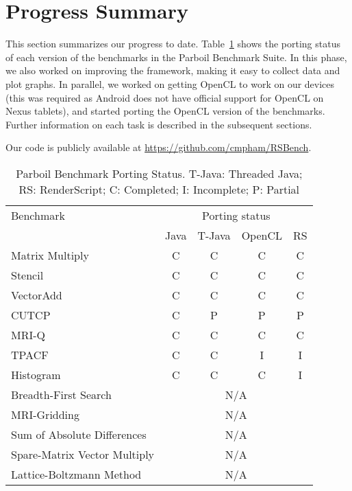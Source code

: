 \section*{Progress Summary}

This section summarizes our progress to date. Table~\ref{table:parboil} shows the
porting status of each version of the benchmarks in the Parboil Benchmark Suite.
In this phase, we also worked on improving the framework, making it easy to collect
data and plot graphs. In parallel, we worked on getting OpenCL to work on our
devices (this was required as Android does not have official support for OpenCL
on Nexus tablets), and started porting the OpenCL version of the benchmarks. 
Further information on each task is described in the subsequent sections.

Our code is publicly available at \url{https://github.com/cmpham/RSBench}.

\begin{table}[h]\small
\centering
\begin{tabular}{ | l | c | c | c | c |}
    \hline 
    Benchmark & \multicolumn{4}{|c|}{Porting status} \\ \cline{2-5}
              & Java & T-Java & OpenCL & RS \\ \hline
    Matrix Multiply & C & C & C & C \\ \hline
    Stencil & C & C & C & C \\ \hline
    VectorAdd & C & C & C & C \\ \hline
    CUTCP & C & P  & P  & P \\ \hline
    MRI-Q & C & C & C & C \\ \hline
    TPACF & C & C & I & I \\ \hline
    Histogram & C & C & C & I \\ \hline
    Breadth-First Search & \multicolumn{4}{|c|}{N/A} \\ \hline
    MRI-Gridding & \multicolumn{4}{|c|}{N/A} \\ \hline
    Sum of Absolute Differences & \multicolumn{4}{|c|}{N/A} \\ \hline
    Spare-Matrix Vector Multiply & \multicolumn{4}{|c|}{N/A} \\ \hline
    Lattice-Boltzmann Method & \multicolumn{4}{|c|}{N/A} \\ \hline
    \hline
\end{tabular}
\caption{Parboil Benchmark Porting Status. T-Java: Threaded Java; RS:
RenderScript; C: Completed; I: Incomplete; P: Partial}
\label{table:parboil}
\end{table}

